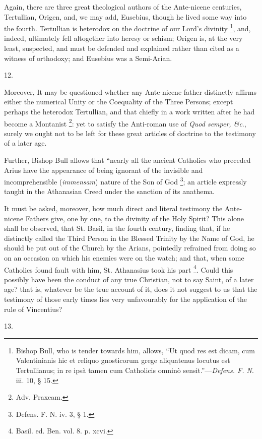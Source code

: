 Again, there are three great theological authors of
the Ante-nicene centuries, Tertullian, Origen, and, we
may add, Eusebius, though he lived some way into the
fourth. Tertullian is heterodox on the doctrine of our
Lord's divinity \footnote{Bishop Bull, who is tender
towards him, allows, ``Ut quod res est dicam, cum
Valentinianis hic et reliquo gnosticorum grege
aliquatenus locutus est Tertullianus; in re ipsà tamen
cum Catholicis omninò sensit.''—\emph{Defens. F. N}.
iii. 10, § 15.}, and, indeed, ultimately fell altogether into
heresy or schism; Origen is, at the very least,
suspected, and must be defended and explained rather than
cited as a witness of orthodoxy; and Eusebius was a
Semi-Arian.

12.

Moreover, It may be questioned whether any Ante-nicene father distinctly affirms either the numerical Unity or
the Coequality of the Three Persons; except perhaps the
heterodox Tertullian, and that chiefly in a work written
after he had become a Montanist \footnote{Adv. Praxeam.}: yet to satisfy the
Anti-roman use of \emph{Quod semper, \&c}., surely we
ought not to be left for these great articles of doctrine
to the testimony of a later age.

Further, Bishop Bull allows that ``nearly all the
ancient Catholics who preceded Arius have the appearance
of being ignorant of the invisible and incomprehensible (\emph{immensam})
nature of the Son of God \footnote{Defens. F. N. iv. 3, § 1.}; an article expressly taught
in the Athanasian Creed under the sanction of its
anathema.

It must be asked, moreover, how much direct and
literal testimony the Ante-nicene Fathers give, one by
one, to the divinity of the Holy Spirit? This alone shall
be observed, that St. Basil, in the fourth century,
finding that, if he distinctly called the Third Person in
the Blessed Trinity by the Name of God, he should be put
out of the Church by the Arians, pointedly refrained from
doing so on an occasion on which his enemies were on the
watch; and that, when some Catholics found fault with
him, St. Athanasius took his part \footnote{Basil. ed. Ben. vol. 8. p.
xcvi.}. Could this possibly have
been the conduct of any true Christian, not to say Saint,
of a later age? that is, whatever be the true account of
it, does it not suggest to us that the testimony of those
early times lies very unfavourably for the application of
the rule of Vincentius?

13.

